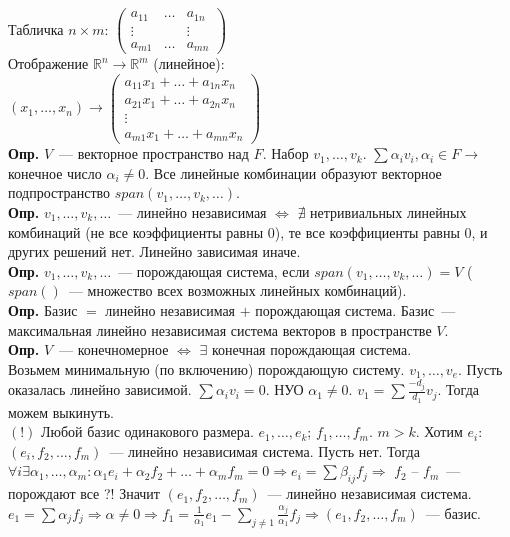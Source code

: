 \documentclass{article}
\begin{document}
	Табличка $n \times m$: $\left(
	\begin{smallmatrix}
		a_{11} & \dots & a_{1n} \\
		\vdots &  & \vdots \\
		a_{m1} & \dots & a_{mn}
	\end{smallmatrix}
	\right)$ \\
	Отображение $\mathbb{R}^n \rightarrow \mathbb{R}^m$ (линейное): \\
	$(x_1, \dots, x_n) \rightarrow \left(
	\begin{smallmatrix}
		a_{11}x_1 + \dots + a_{1n}x_n \\
		a_{21}x_1 + \dots + a_{2n}x_n \\
		\vdots \\
		a_{m1}x_1 + \dots + a_{mn}x_n
	\end{smallmatrix}
	\right)$ \\
	\textbf{Опр.} $V$~--- векторное пространство над $F$. Набор $v_1, \dots, v_k$. $\sum \alpha_i v_i, \alpha_i \in F \rightarrow$ конечное число $\alpha_i \not= 0$. Все линейные комбинации образуют векторное подпространство $span(v_1, \dots, v_k, \dots)$. \\
	\textbf{Опр.} $v_1, \dots, v_k, \dots$~--- линейно независимая $\Leftrightarrow$ $\nexists$ нетривиальных линейных комбинаций (не все коэффициенты равны $0$), те все коэффициенты равны $0$, и других решений нет. Линейно зависимая иначе. \\
	\textbf{Опр.} $v_1, \dots, v_k, \dots$~--- порождающая система, если $span(v_1, \dots, v_k, \dots) = V$ ($span()$~--- множество всех возможных линейных комбинаций). \\
	\textbf{Опр.} Базис $=$ линейно независимая $+$ порождающая система. Базис~--- максимальная линейно независимая система векторов в пространстве $V$. \\
	\textbf{Опр.} $V$~--- конечномерное $\Leftrightarrow$ $\exists$ конечная порождающая система. \\
	Возьмем минимальную (по включению) порождающую систему. $v_1, \dots, v_e$. Пусть оказалась линейно зависимой. $\sum \alpha_i v_i = 0$. НУО $\alpha_1 \not= 0$. $v_1 = \sum \frac{-d_j}{d_1} v_j$. Тогда можем выкинуть. \\
	$(!)$ Любой базис одинакового размера. $e_1, \dots, e_k$; $f_1, \dots, f_m$. $m > k$. Хотим $e_i$: $(e_i, f_2, \dots, f_m)$~--- линейно независимая система. Пусть нет. Тогда $\forall i \exists \alpha_1, \dots, \alpha_m: \alpha_1e_i + \alpha_2f_2 + \dots + \alpha_mf_m = 0 \Rightarrow e_i = \sum \beta_{ij} f_j \Rightarrow$ $f_2$ -- $f_m$~--- порождают все ?! Значит $(e_1, f_2, \dots, f_m)$~--- линейно независимая система. $e_1 = \sum \alpha_j f_j \Rightarrow \alpha \not= 0 \Rightarrow f_1 = \frac{1}{\alpha_1}e_1 - \sum\limits_{j \not= 1} \frac{\alpha_j}{\alpha_1} f_j \Rightarrow (e_1, f_2, \dots, f_m)$~--- базис. \\
\end{document}
